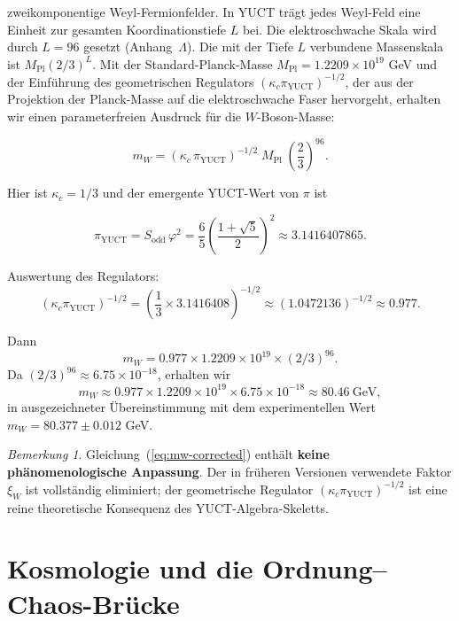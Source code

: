 \documentclass[12pt,a4paper]{article}
\theoremstyle{remark}
\newtheorem{remark}[theorem]{Bemerkung}
\begin{document}
	zweikomponentige Weyl-Fermionfelder. In YUCT trägt jedes Weyl-Feld eine Einheit
	zur gesamten Koordinationstiefe \(L\) bei. Die elektroschwache Skala wird durch
	\(L = 96\) gesetzt (Anhang~\(\Lambda\)). Die mit der Tiefe \(L\) verbundene
	Massenskala ist \(M_{\mathrm{Pl}} (2/3)^{L}\). Mit der Standard-Planck-Masse
	\(M_{\mathrm{Pl}} = 1.2209 \times 10^{19}\) GeV und der Einführung des
	geometrischen Regulators \((\kappa_c \pi_{\mathrm{YUCT}})^{-1/2}\), der aus
	der Projektion der Planck-Masse auf die elektroschwache Faser hervorgeht,
	erhalten wir einen parameterfreien Ausdruck für die \(W\)-Boson-Masse:
	
	\begin{equation}
		\boxed{m_W = \left( \kappa_c \, \pi_{\mathrm{YUCT}} \right)^{-1/2}
			\; M_{\mathrm{Pl}} \; \left( \frac{2}{3} \right)^{96}}.
		\label{eq:mw-corrected}
	\end{equation}
	
	Hier ist \(\kappa_c = 1/3\) und der emergente YUCT-Wert von \(\pi\) ist
	
	\[
	\pi_{\mathrm{YUCT}} = S_{\mathrm{odd}} \, \varphi^2
	= \frac{6}{5} \left( \frac{1+\sqrt{5}}{2} \right)^2
	\approx 3.1416407865.
	\]
	
	Auswertung des Regulators:
	\[
	\left( \kappa_c \pi_{\mathrm{YUCT}} \right)^{-1/2}
	= \left( \frac{1}{3} \times 3.1416408 \right)^{-1/2}
	\approx (1.0472136)^{-1/2} \approx 0.977.
	\]
	
	Dann
	\[
	m_W = 0.977 \times 1.2209 \times 10^{19} \times (2/3)^{96}.
	\]
	Da \((2/3)^{96} \approx 6.75 \times 10^{-18}\), erhalten wir
	\[
	m_W \approx 0.977 \times 1.2209 \times 10^{19} \times 6.75 \times 10^{-18}
	\approx 80.46\ \text{GeV},
	\]
	in ausgezeichneter Übereinstimmung mit dem experimentellen Wert
	\(m_W = 80.377 \pm 0.012\) GeV.
	
	\begin{remark}
		Gleichung~(\ref{eq:mw-corrected}) enthält \textbf{keine phänomenologische Anpassung}.
		Der in früheren Versionen verwendete Faktor \(\xi_W\) ist vollständig
		eliminiert; der geometrische Regulator \((\kappa_c\pi_{\mathrm{YUCT}})^{-1/2}\)
		ist eine reine theoretische Konsequenz des YUCT-Algebra-Skeletts.
	\end{remark}
	
	\section{Kosmologie und die Ordnung--Chaos-Brücke}
	\label{sec:cosmology}
	
\end{document}
